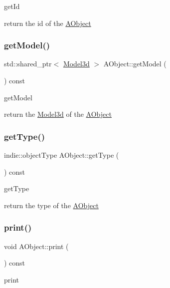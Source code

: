 get\+Id 

return the id of the \hyperlink{classAObject}{A\+Object} \mbox{\label{classAObject_a3ffaa331c1842c5bf782c9a0343474bc}} 
\subsubsection{\texorpdfstring{get\+Model()}{getModel()}}
{\footnotesize\ttfamily std\+::shared\+\_\+ptr$<$ \hyperlink{classModel3d}{Model3d} $>$ A\+Object\+::get\+Model (\begin{DoxyParamCaption}{ }\end{DoxyParamCaption}) const}



get\+Model 

return the \hyperlink{classModel3d}{Model3d} of the \hyperlink{classAObject}{A\+Object} \mbox{\label{classAObject_afcbaa047c0d02ca29b76875157a1eb1e}} 
\subsubsection{\texorpdfstring{get\+Type()}{getType()}}
{\footnotesize\ttfamily indie\+::object\+Type A\+Object\+::get\+Type (\begin{DoxyParamCaption}{ }\end{DoxyParamCaption}) const}



get\+Type 

return the type of the \hyperlink{classAObject}{A\+Object} \mbox{\label{classAObject_aebbd61ad13e23fa7787a5cdf12acd4ca}} 
\subsubsection{\texorpdfstring{print()}{print()}}
{\footnotesize\ttfamily void A\+Object\+::print (\begin{DoxyParamCaption}{ }\end{DoxyParamCaption}) const}



print 

